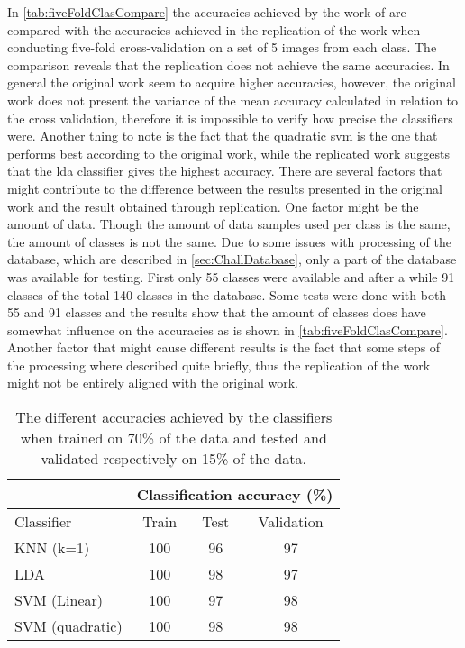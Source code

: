 In \autoref{tab:fiveFoldClasCompare} the accuracies achieved by the work of \cite{Khan2017a} are compared with the accuracies achieved in the replication of the work when conducting five-fold cross-validation on a set of 5 images from each class. The comparison reveals that the replication does not achieve the same accuracies. In general the original work seem to acquire higher accuracies, however, the original work does not present the variance of the mean accuracy calculated in relation to the cross validation, therefore it is impossible to verify how precise the classifiers were. Another thing to note is the fact that the quadratic \gls{svm} is the one that performs best according to the original work, while the replicated work suggests that the \gls{lda} classifier gives the highest accuracy. There are several factors that might contribute to the difference between the results presented in the original work and the result obtained through replication. One factor might be the amount of data. Though the amount of data samples used per class is the same, the amount of classes is not the same. Due to some issues with processing of the database, which are described in \autoref{sec:ChallDatabase}, only a part of the database was available for testing. First only 55 classes were available and after a while 91 classes of the total 140 classes in the database. Some tests were done with both 55 and 91 classes and the results show that the amount of classes does have somewhat influence on the accuracies as is shown in \autoref{tab:fiveFoldClasCompare}. Another factor that might cause different results is the fact that some steps of the processing where described quite briefly, thus the replication of the work might not be entirely aligned with the original work. 

\begin{table}[h]
\centering
\begin{tabular}{|l|c|c|c|}
\cline{2-4}
\multicolumn{1}{c|}{}&\multicolumn{3}{c|}{Classification accuracy (\%)}\\
\hline
Classifier&Train&Test&Validation\\
\hline
KNN (k=1)&100&96&97\\
\hline
LDA&100&98&97\\
\hline
SVM (Linear)&100&97&98\\
\hline
SVM (quadratic)&100&98&98\\
\hline
\end{tabular}
\caption{The different accuracies achieved by the classifiers when trained on 70\% of the data and tested and validated respectively on 15\% of the data.}
\label{tab:ClasAccMachine}
\end{table} 

